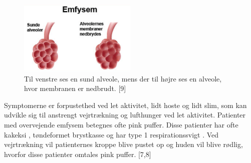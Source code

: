 \begin{figure} [H]
\centering
\includegraphics[width=0.5\textwidth]{figures/emfysem}
\caption{Til venstre ses en sund alveole, mens der til højre ses en alveole, hvor membranen er nedbrudt.  [9]}
\label{fig:emfysem}
\end{figure} 

\noindent
Symptomerne er forpustethed ved let aktivitet, lidt hoste og lidt slim, som kan udvikle sig til anstrengt vejrtrækning og lufthunger ved let aktivitet. Patienter med overvejende emfysem betegnes ofte pink puffer. Disse patienter har ofte kakeksi , tøndeformet brystkasse og har type 1 respirationssvigt . Ved vejrtrækning vil patienternes kroppe blive  pustet op og huden vil blive rødlig, hvorfor disse patienter omtales pink puffer. [7,8]



